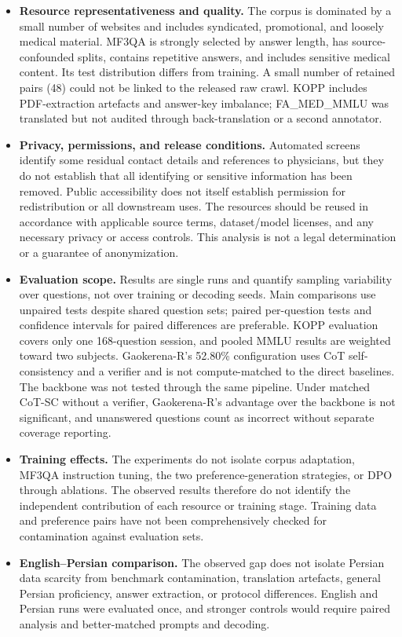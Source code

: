 \documentclass[manuscript,screen,review]{acmart}
\begin{document}
\begin{itemize}
\item \textbf{Resource representativeness and quality.} The corpus is dominated by a small number of websites and includes syndicated, promotional, and loosely medical material. MF3QA is strongly selected by answer length, has source-confounded splits, contains repetitive answers, and includes sensitive medical content. Its test distribution differs from training. A small number of retained pairs (48) could not be linked to the released raw crawl. KOPP includes PDF-extraction artefacts and answer-key imbalance; FA\_MED\_MMLU was translated but not audited through back-translation or a second annotator.
\item \textbf{Privacy, permissions, and release conditions.} Automated screens identify some residual contact details and references to physicians, but they do not establish that all identifying or sensitive information has been removed. Public accessibility does not itself establish permission for redistribution or all downstream uses. The resources should be reused in accordance with applicable source terms, dataset/model licenses, and any necessary privacy or access controls. This analysis is not a legal determination or a guarantee of anonymization.
\item \textbf{Evaluation scope.} Results are single runs and quantify sampling variability over questions, not over training or decoding seeds. Main comparisons use unpaired tests despite shared question sets; paired per-question tests and confidence intervals for paired differences are preferable. KOPP evaluation covers only one 168-question session, and pooled MMLU results are weighted toward two subjects. Gaokerena-R's 52.80\% configuration uses CoT self-consistency and a verifier and is not compute-matched to the direct baselines. The backbone was not tested through the same pipeline. Under matched CoT-SC without a verifier, Gaokerena-R's advantage over the backbone is not significant, and unanswered questions count as incorrect without separate coverage reporting.
\item \textbf{Training effects.} The experiments do not isolate corpus adaptation, MF3QA instruction tuning, the two preference-generation strategies, or DPO through ablations. The observed results therefore do not identify the independent contribution of each resource or training stage. Training data and preference pairs have not been comprehensively checked for contamination against evaluation sets.
\item \textbf{English--Persian comparison.} The observed gap does not isolate Persian data scarcity from benchmark contamination, translation artefacts, general Persian proficiency, answer extraction, or protocol differences. English and Persian runs were evaluated once, and stronger controls would require paired analysis and better-matched prompts and decoding.

\end{itemize}
\end{document}
